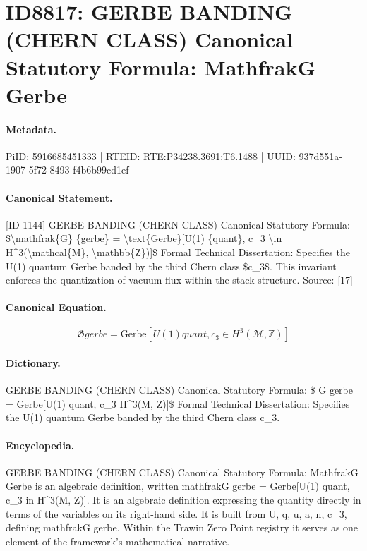 \section*{ID8817: GERBE BANDING (CHERN CLASS) Canonical Statutory Formula: MathfrakG Gerbe}
\paragraph{Metadata.}
PiID: 5916685451333 | RTEID: RTE:P34238.3691:T6.1488 | UUID: 937d551a-1907-5f72-8493-f4b6b99cd1ef

\paragraph{Canonical Statement.}
[ID 1144] GERBE BANDING (CHERN CLASS) Canonical Statutory Formula: \$\textbackslash{}mathfrak\{G\} \{gerbe\} = \textbackslash{}text\{Gerbe\}[U(1) \{quant\}, c\_3 \textbackslash{}in H\textasciicircum{}3(\textbackslash{}mathcal\{M\}, \textbackslash{}mathbb\{Z\})]\$ Formal Technical Dissertation: Specifies the U(1) quantum Gerbe banded by the third Chern class \$c\_3\$. This invariant enforces the quantization of vacuum flux within the stack structure. Source: [17]

\paragraph{Canonical Equation.}
\[
\mathfrak{G} {gerbe} = \text{Gerbe}[U(1) {quant}, c_3 \in H^3(\mathcal{M}, \mathbb{Z})]
\]

\paragraph{Dictionary.}
GERBE BANDING (CHERN CLASS) Canonical Statutory Formula: \$ G gerbe = Gerbe[U(1) quant, c\_3 H\textasciicircum{}3(M, Z)]\$ Formal Technical Dissertation: Specifies the U(1) quantum Gerbe banded by the third Chern class c\_3.

\paragraph{Encyclopedia.}
GERBE BANDING (CHERN CLASS) Canonical Statutory Formula: MathfrakG Gerbe is an algebraic definition, written mathfrakG gerbe = Gerbe[U(1) quant, c\_3 in H\textasciicircum{}3(M, Z)]. It is an algebraic definition expressing the quantity directly in terms of the variables on its right-hand side. It is built from U, q, u, a, n, c\_3, defining mathfrakG gerbe. Within the Trawin Zero Point registry it serves as one element of the framework's mathematical narrative.
